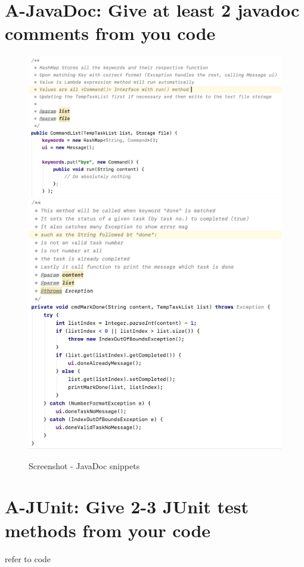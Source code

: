 \documentclass[a4paper,11pt, twoside]{article}
\begin{document}
\begin{table} [htbp]
\section* {A-JavaDoc: Give at least 2 javadoc comments from you code} 
\begin{figure}[H]
\centering
\includegraphics[width = 15.4cm]{jdoc.png}
\includegraphics[width = 14.8cm]{jdoc2.png}
\caption{Screenshot - JavaDoc snippets} 
\end{figure} 


\section* {A-JUnit: Give 2-3 JUnit test methods from your code} 
refer to code


\end{table}
\end{document}
